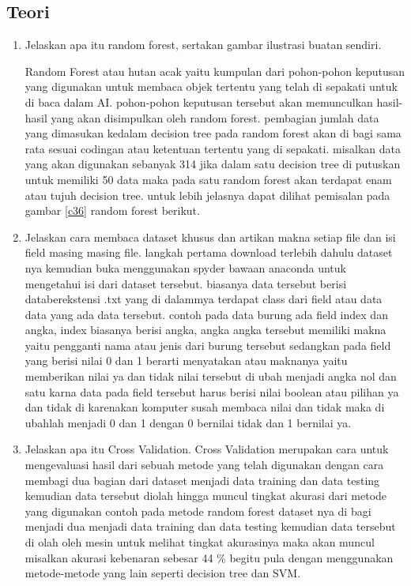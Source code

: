 \subsection{Teori}
\begin{enumerate}
\item Jelaskan apa itu random forest, sertakan gambar ilustrasi buatan sendiri.\par
Random Forest atau hutan acak yaitu kumpulan dari pohon-pohon keputusan yang digunakan untuk membaca objek tertentu yang telah di sepakati untuk di baca dalam AI. pohon-pohon keputusan tersebut akan memunculkan hasil-hasil yang akan disimpulkan oleh random forest. pembagian jumlah data yang dimasukan kedalam decision tree pada random forest akan di bagi sama rata sesuai codingan atau ketentuan tertentu yang di sepakati. misalkan data yang akan digunakan sebanyak 314 jika dalam satu decision tree di putuskan untuk memiliki 50 data maka pada satu random forest akan terdapat enam atau tujuh decision tree. untuk lebih jelasnya dapat dilihat pemisalan pada gambar \ref{c36} random forest berikut.


\item Jelaskan cara membaca dataset khusus dan artikan makna setiap file dan isi field masing masing file.
langkah pertama download terlebih dahulu dataset nya kemudian buka menggunakan spyder bawaan anaconda untuk mengetahui isi dari dataset tersebut. biasanya data tersebut berisi databerekstensi .txt yang di dalammya terdapat class dari field atau data data yang ada data tersebut. contoh pada data burung ada field index dan angka, index biasanya berisi angka, angka angka tersebut memiliki makna yaitu pengganti nama atau jenis dari burung tersebut sedangkan pada field yang berisi nilai 0 dan 1 berarti menyatakan atau maknanya yaitu memberikan nilai ya dan tidak nilai tersebut di ubah menjadi angka nol dan satu karna data pada field tersebut harus berisi nilai boolean atau pilihan ya dan tidak di karenakan komputer susah membaca nilai dan tidak maka di ubahlah menjadi 0 dan 1 dengan 0 bernilai tidak dan 1 bernilai ya.

\item Jelaskan apa itu Cross Validation.
Cross Validation merupakan cara untuk mengevaluasi hasil dari sebuah metode yang telah digunakan dengan cara membagi dua bagian dari dataset menjadi data training dan data testing kemudian data tersebut diolah hingga muncul tingkat akurasi dari metode yang digunakan contoh pada metode random forest dataset nya di bagi menjadi dua menjadi data training dan data testing kemudian data tersebut di olah oleh mesin untuk melihat tingkat akurasinya maka akan muncul misalkan akurasi kebenaran sebesar 44 \% begitu pula dengan menggunakan metode-metode yang lain seperti decision tree dan SVM.



\end{enumerate}
